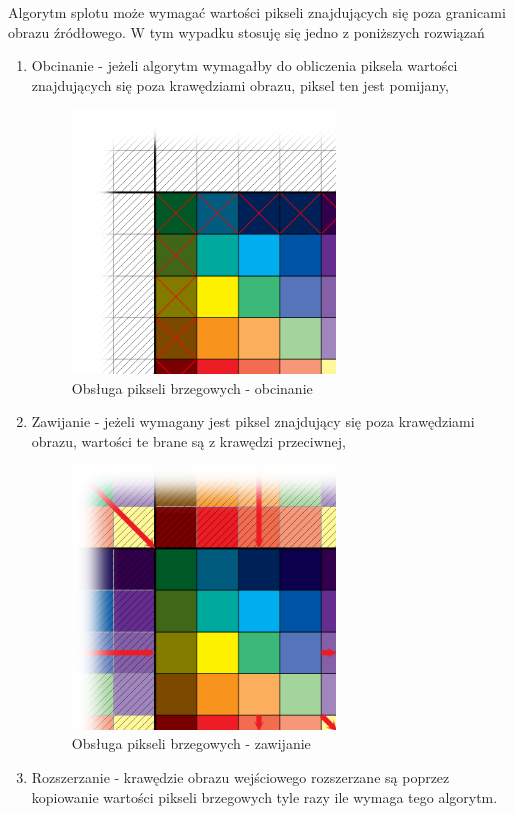 \documentclass[twoside]{projektInzynierskiMS}
\begin{document}
Algorytm splotu może wymagać wartości pikseli znajdujących się poza granicami obrazu źródłowego. W tym wypadku stosuję się jedno z poniższych rozwiązań
\begin{enumerate}
	\item Obcinanie - jeżeli algorytm wymagałby do obliczenia piksela wartości znajdujących się poza krawędziami obrazu, piksel ten jest pomijany,
	\begin{figure}[h]
		\centering
		\includegraphics[width=7cm]{clipping.png}
		\caption{Obsługa pikseli brzegowych - obcinanie}
	\end{figure}
	\item Zawijanie - jeżeli wymagany jest piksel znajdujący się poza krawędziami obrazu, wartości te brane są z krawędzi przeciwnej,
	\newpage
	\begin{figure}[h]
		\centering
		\includegraphics[width=7cm]{wrapping.png}
		\caption{Obsługa pikseli brzegowych - zawijanie}
	\end{figure}
	\item Rozszerzanie - krawędzie obrazu wejściowego rozszerzane są poprzez kopiowanie wartości pikseli brzegowych tyle razy ile wymaga tego algorytm.
	\begin{figure}[h]

\end{figure}
\end{enumerate}
\end{document}
